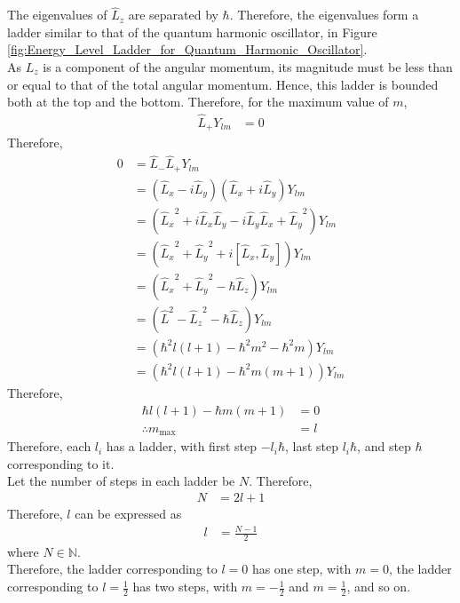 \documentclass[titlepage, fleqn, a4paper, 12pt, twoside]{article}
\theoremstyle{definition}
\theoremstyle{theorem}
\begin{document}
The eigenvalues of $\hat{L}_z$ are separated by $\hbar$.
Therefore, the eigenvalues form a ladder similar to that of the quantum harmonic oscillator, in Figure \ref{fig:Energy_Level_Ladder_for_Quantum_Harmonic_Oscillator}.\\
As $L_z$ is a component of the angular momentum, its magnitude must be less than or equal to that of the total angular momentum.
Hence, this ladder is bounded both at the top and the bottom.
Therefore, for the maximum value of $m$,
\begin{align*}
	\hat{L}_+ Y_{l m} &= 0
\end{align*}
Therefore,
\begin{align*}
	0 &= \hat{L}_- \hat{L}_+ Y_{l m}\\
	&= \left( \hat{L}_x - i \hat{L}_y \right) \left( \hat{L}_x + i \hat{L}_y \right) Y_{l m}\\
	&= \left( {\hat{L}_x}^2 + i \hat{L}_x \hat{L}_y - i \hat{L}_y \hat{L}_x + {\hat{L}_y}^2 \right) Y_{l m}\\
	&= \left( {\hat{L}_x}^2 + {\hat{L}_y}^2 + i \left[ \hat{L}_x,\hat{L}_y \right] \right) Y_{l m}\\
	&= \left( {\hat{L}_x}^2 + {\hat{L}_y}^2 - \hbar \hat{L}_z \right) Y_{l m}\\
	&= \left( \hat{L}^2 - {\hat{L}_z}^2 - \hbar \hat{L}_z \right) Y_{l m}\\
	&= \left( \hbar^2 l (l + 1) - \hbar^2 m^2 - \hbar^2 m \right) Y_{l m}\\
	&= \left( \hbar^2 l (l + 1) - \hbar^2 m (m + 1) \right) Y_{l m}
\end{align*}
Therefore,
\begin{align*}
	\hbar l (l + 1) - \hbar m (m + 1) &= 0\\
	\therefore m_{\text{max}} &= l
\end{align*}
Therefore, each $l_i$ has a ladder, with first step $-l_i \hbar$, last step $l_i \hbar$, and step $\hbar$ corresponding to it.\\
Let the number of steps in each ladder be $N$.
Therefore,
\begin{align*}
	N &= 2 l + 1
\end{align*}
Therefore, $l$ can be expressed as
\begin{align*}
	l &= \frac{N - 1}{2}
\end{align*}
where $N \in \mathbb{N}$.\\
Therefore, the ladder corresponding to $l = 0$ has one step, with $m = 0$, the ladder corresponding to $l = \frac{1}{2}$ has two steps, with $m = -\frac{1}{2}$ and $m = \frac{1}{2}$, and so on.
\end{document}
